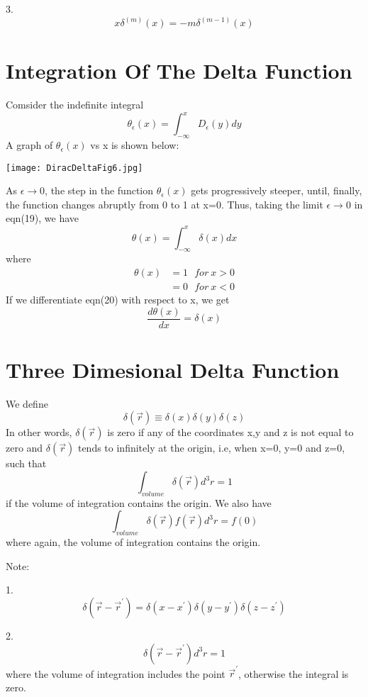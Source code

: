 3.$$x \delta^{(m)} (x) = -m \delta^{(m-1)} (x)$$

\section*{Integration Of The Delta Function}
Comsider the indefinite integral
\begin{equation}
\theta_\epsilon (x) = \int_{-\infty}^{x} D_\epsilon (y) dy
\end{equation}
A graph of $\theta_\epsilon (x)$ vs x is shown below:
\vspace{0.2cm}
\begin{center}
\texttt{[image: DiracDeltaFig6.jpg]}
\end{center}
As $\epsilon \to 0$, the step in the function $\theta_\epsilon (x)$ gets progressively steeper, until, finally, the function changes abruptly from 0 to 1 at x=0.
Thus, taking the limit $\epsilon \to 0$ in eqn(19), we have
\begin{equation}
\theta (x) = \int_{-\infty}^{x} \delta (x) dx
\end{equation}
where 
\begin{align*}
\theta (x) &= 1 \ \ \ for \ x>0\\
&=0 \ \ \ for \ x<0
\end{align*}
If we differentiate eqn(20) with respect to x, we get 
\begin{equation}
\frac{d\theta (x)}{dx} = \delta (x)
\end{equation}

\section*{Three Dimesional Delta Function}
We define $$\delta (\vec{r}) \equiv \delta (x) \delta (y) \delta (z)$$
In other words, $\delta (\vec{r})$ is zero if any of the coordinates x,y and z is not equal to zero and $\delta (\vec{r})$ tends to infinitely at the origin, i.e, when x=0, y=0 and z=0, such that $$\int_{volume} \delta (\vec{r}) d^3r = 1$$ if the volume of integration contains the origin. We also have $$\int_{volume} \delta (\vec{r}) f(\vec{r}) d^3r = f(0)$$ where again, the volume of integration contains the origin.

Note:

1. $$\delta (\vec{r} - \vec{r}^\prime) = \delta (x-x^\prime) \delta (y-y^\prime) \delta (z-z^\prime)$$

2.$$\delta (\vec{r} - \vec{r}^\prime) d^3r = 1$$ where the volume of integration includes the point $\vec{r}^\prime$, otherwise the integral is zero.

